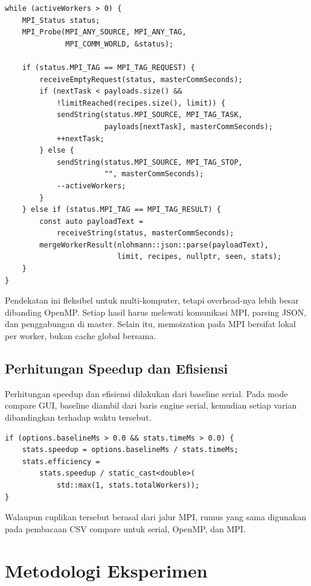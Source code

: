 \documentclass[conference]{IEEEtran}
\begin{document}
\begin{lstlisting}[style=cppstyle,caption={Pola komunikasi master-worker pada MPI.}]
while (activeWorkers > 0) {
    MPI_Status status;
    MPI_Probe(MPI_ANY_SOURCE, MPI_ANY_TAG,
              MPI_COMM_WORLD, &status);

    if (status.MPI_TAG == MPI_TAG_REQUEST) {
        receiveEmptyRequest(status, masterCommSeconds);
        if (nextTask < payloads.size() &&
            !limitReached(recipes.size(), limit)) {
            sendString(status.MPI_SOURCE, MPI_TAG_TASK,
                       payloads[nextTask], masterCommSeconds);
            ++nextTask;
        } else {
            sendString(status.MPI_SOURCE, MPI_TAG_STOP,
                       "", masterCommSeconds);
            --activeWorkers;
        }
    } else if (status.MPI_TAG == MPI_TAG_RESULT) {
        const auto payloadText =
            receiveString(status, masterCommSeconds);
        mergeWorkerResult(nlohmann::json::parse(payloadText),
                          limit, recipes, nullptr, seen, stats);
    }
}
\end{lstlisting}

Pendekatan ini fleksibel untuk multi-komputer, tetapi overhead-nya lebih besar dibanding OpenMP. Setiap hasil harus melewati komunikasi MPI, parsing JSON, dan penggabungan di master. Selain itu, memoization pada MPI bersifat lokal per worker, bukan cache global bersama.

\subsection{Perhitungan Speedup dan Efisiensi}

Perhitungan speedup dan efisiensi dilakukan dari baseline serial. Pada mode compare GUI, baseline diambil dari baris engine serial, kemudian setiap varian dibandingkan terhadap waktu tersebut.

\begin{lstlisting}[style=cppstyle,caption={Rumus speedup dan efficiency pada statistik MPI.}]
if (options.baselineMs > 0.0 && stats.timeMs > 0.0) {
    stats.speedup = options.baselineMs / stats.timeMs;
    stats.efficiency =
        stats.speedup / static_cast<double>(
            std::max(1, stats.totalWorkers));
}
\end{lstlisting}

Walaupun cuplikan tersebut berasal dari jalur MPI, rumus yang sama digunakan pada pembacaan CSV compare untuk serial, OpenMP, dan MPI.

\section{Metodologi Eksperimen}
\end{document}
